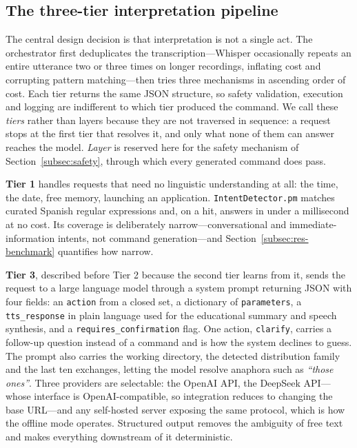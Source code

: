\documentclass[10pt,a4paper]{article}
\begin{document}
\subsection{The three-tier interpretation pipeline}
\label{subsec:pipeline}

The central design decision is that interpretation is not a single act. The orchestrator first deduplicates the transcription---Whisper occasionally repeats an entire utterance two or three times on longer recordings, inflating cost and corrupting pattern matching---then tries three mechanisms in ascending order of cost. Each tier returns the same JSON structure, so safety validation, execution and logging are indifferent to which tier produced the command. We call these \emph{tiers} rather than layers because they are not traversed in sequence: a request stops at the first tier that resolves it, and only what none of them can answer reaches the model. \emph{Layer} is reserved here for the safety mechanism of Section~\ref{subsec:safety}, through which every generated command does pass.

\textbf{Tier 1} handles requests that need no linguistic understanding at all: the time, the date, free memory, launching an application. \texttt{IntentDetector.pm} matches curated Spanish regular expressions and, on a hit, answers in under a millisecond at no cost. Its coverage is deliberately narrow---conversational and immediate-information intents, not command generation---and Section~\ref{subsec:res-benchmark} quantifies how narrow.

\textbf{Tier 3}, described before Tier 2 because the second tier learns from it, sends the request to a large language model through a system prompt \citep{Wei2022} returning JSON with four fields: an \texttt{action} from a closed set, a dictionary of \texttt{parameters}, a \texttt{tts\_response} in plain language used for the educational summary and speech synthesis, and a \texttt{requires\_confirmation} flag. One action, \texttt{clarify}, carries a follow-up question instead of a command and is how the system declines to guess. The prompt also carries the working directory, the detected distribution family and the last ten exchanges, letting the model resolve anaphora such as \textit{``those ones''}. Three providers are selectable: the OpenAI API, the DeepSeek API---whose interface is OpenAI-compatible, so integration reduces to changing the base URL---and any self-hosted server exposing the same protocol, which is how the offline mode operates. Structured output removes the ambiguity of free text and makes everything downstream of it deterministic.
\end{document}
